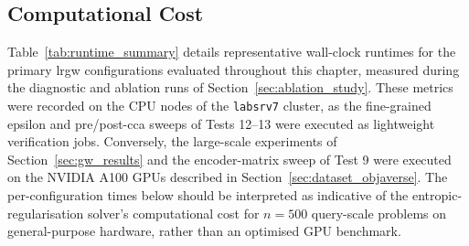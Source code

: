 \subsection{Computational Cost}
\label{subsec:computational_cost}

Table~\ref{tab:runtime_summary} details representative wall-clock runtimes for the primary \gls{lrgw} configurations evaluated throughout this chapter, measured during the diagnostic and ablation runs of Section~\ref{sec:ablation_study}. These metrics were recorded on the CPU nodes of the \texttt{labsrv7} cluster, as the fine-grained epsilon and pre/post-\gls{cca} sweeps of Tests 12--13 were executed as lightweight verification jobs. Conversely, the large-scale experiments of Section~\ref{sec:gw_results} and the encoder-matrix sweep of Test 9 were executed on the NVIDIA A100 GPUs described in Section~\ref{sec:dataset_objaverse}. The per-configuration times below should be interpreted as indicative of the entropic-regularisation solver's computational cost for $n{=}500$ query-scale problems on general-purpose hardware, rather than an optimised GPU benchmark.

\begin{table}[htpb]
\centering
\small
{}
\caption{Representative wall-clock runtimes for the epsilon sweep of Test 13
(Section~\ref{subsec:advanced_verifications}) and the diagnostic GW analysis
of Section~\ref{sec:why_gw_fails}, measured on CPU nodes of the
\texttt{labsrv7} cluster at query-scale ($n{=}500$--$1{,}000$). Both the
post- and pre-CCA configurations demonstrate near-identical per-iteration cost,
consistent with the fact that LR-GW's complexity depends on the number of
samples $n$ rather than on the input feature dimensionality, since the
solver operates on $n \times n$ intra-domain distance matrices rather than
on the raw feature vectors.}
\label{tab:runtime_summary}
\end{table}

